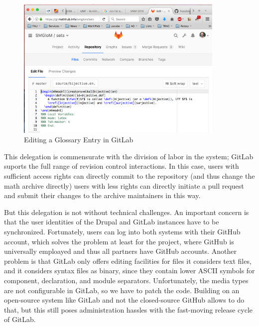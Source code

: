 \begin{figure}[ht]\centering
  \includegraphics[width=10cm]{bijective-edit}
  \caption{Editing a Glossary Entry in GitLab}\label{fig:bijective-edit}
\end{figure}

This delegation is commensurate with the division of labor in the \sys system; GitLab
suports the full range of revision control interactions. In this case, users with
sufficient access rights can directly commit to the repository (and thus change the math
archive directly) users with less rights can directly initiate a pull request and submit
their changes to the archive maintainers in this way. 

But this delegation is not without technical challenges. An important concern is that the
user identities of the Drupal and GitLab instances have to be synchronized. Fortunately,
users can log into both systems with their GitHub account, which solves the problem at
least for the \pn project, where GitHub is universally emploayed and thus all partners
have GitHub accounts. Another problem is that GitLab only offers editing facilities for
files it considers text files, and it considers \mmt syntax files as binary, since they
contain lower ASCII symbols for component, declaration, and module separators.
Unfortunately, the media types are not configurable in GitLab, so we have to patch the
code. Building on an open-source system like GitLab and not the closed-source GitHub
allows to do that, but this still poses administration hassles with the fast-moving
release cycle of GitLab.


